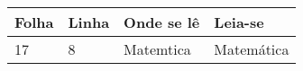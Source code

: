 \begin{errata}

\begin{table}[htb]
    \center
    \footnotesize
    \begin{tabular}{|p{1.4cm}|p{1cm}|p{3cm}|p{3cm}|}
    \hline
    \textbf{Folha} & \textbf{Linha} & \textbf{Onde se lê} &
    \textbf{Leia-se}\\
    \hline
    17 & 8 & Matemtica & Matemática \\
    \hline
    \end{tabular}
\end{table}

\end{errata}